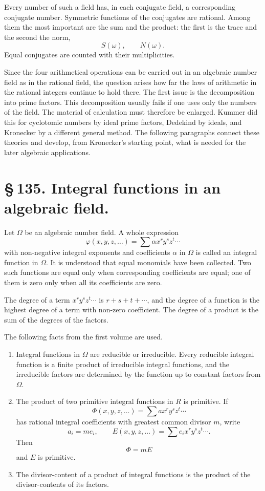 \documentclass[11pt]{article}
\begin{document}
Every number of such a field has, in each conjugate field, a
corresponding conjugate number. Symmetric functions of the conjugates
are rational. Among them the most important are the sum and the
product: the first is the trace and the second the norm,
\[
S(\omega),\qquad N(\omega).
\]
Equal conjugates are counted with their multiplicities.

Since the four arithmetical operations can be carried out in an
algebraic number field as in the rational field, the question arises
how far the laws of arithmetic in the rational integers continue to
hold there. The first issue is the decomposition into prime factors.
This decomposition usually fails if one uses only the numbers of the
field. The material of calculation must therefore be enlarged. Kummer
did this for cyclotomic numbers by ideal prime factors, Dedekind by
ideals, and Kronecker by a different general method. The following
paragraphs connect these theories and develop, from Kronecker's
starting point, what is needed for the later algebraic applications.

\section*{\S\,135. Integral functions in an algebraic field.}

Let \(\Omega\) be an algebraic number field. A whole expression
\begin{equation}
\varphi(x,y,z,\ldots)=\sum \alpha x^r y^s z^t\cdots
\tag{1}
\end{equation}
with non-negative integral exponents and coefficients \(\alpha\) in
\(\Omega\) is called an integral function in \(\Omega\). It is
understood that equal monomials have been collected. Two such
functions are equal only when corresponding coefficients are equal;
one of them is zero only when all its coefficients are zero.

The degree of a term \(x^r y^s z^t\cdots\) is
\(r+s+t+\cdots\), and the degree of a function is the highest degree
of a term with non-zero coefficient. The degree of a product is the
sum of the degrees of the factors.

The following facts from the first volume are used.
\begin{enumerate}[label=\arabic*.]
\item Integral functions in \(\Omega\) are reducible or irreducible.
Every reducible integral function is a finite product of irreducible
integral functions, and the irreducible factors are determined by the
function up to constant factors from \(\Omega\).

\item The product of two primitive integral functions in \(R\) is
primitive. If
\[
\Phi(x,y,z,\ldots)=\sum a x^r y^s z^t\cdots
\tag{2}
\]
has rational integral coefficients with greatest common divisor \(m\),
write
\[
a_i=m e_i,\qquad
E(x,y,z,\ldots)=\sum e_i x^r y^s z^t\cdots.
\tag{3}
\]
Then
\[
\Phi=mE
\tag{4}
\]
and \(E\) is primitive.

\item The divisor-content of a product of integral functions is the
product of the divisor-contents of its factors.
\end{enumerate}
\end{document}
